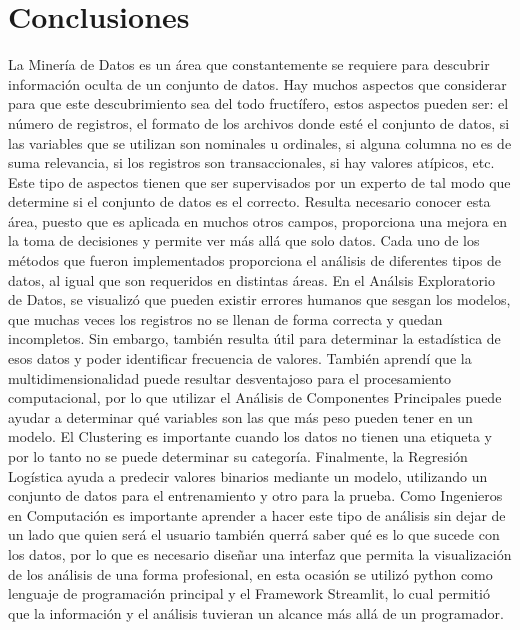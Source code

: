 \documentclass{article}
\begin{document}
\section{Conclusiones}
La Minería de Datos es un área que constantemente se requiere para descubrir información oculta de un conjunto de datos. Hay muchos aspectos que considerar para que este descubrimiento
sea del todo fructífero, estos aspectos pueden ser: el número de registros, el formato de los archivos donde esté el conjunto de datos, si las variables que se utilizan son 
nominales u ordinales, si alguna columna no es de suma relevancia, si los registros son transaccionales, si hay valores atípicos, etc. Este tipo de aspectos tienen que ser supervisados 
por un experto de tal modo que determine si el conjunto de datos es el correcto.
\newline
\newline
\noindent
Resulta necesario conocer esta área, puesto que es aplicada en muchos otros campos, proporciona una mejora en la toma de decisiones y permite ver más allá que solo datos.
Cada uno de los métodos que fueron implementados proporciona el análisis de diferentes tipos de datos, al igual que son requeridos en distintas áreas. En el
Análsis Exploratorio de Datos, se visualizó que pueden existir errores humanos que sesgan los modelos, que muchas veces los registros no se llenan de forma correcta y quedan incompletos.
Sin embargo, también resulta útil para determinar la estadística de esos datos y poder identificar frecuencia de valores. También aprendí que la multidimensionalidad puede resultar
desventajoso para el procesamiento computacional, por lo que utilizar el Análisis de Componentes Principales puede ayudar a determinar qué variables son las que más peso pueden tener
en un modelo. El Clustering es importante cuando los datos no tienen una etiqueta y por lo tanto no se puede determinar su categoría. Finalmente, la Regresión Logística ayuda a predecir
valores binarios mediante un modelo, utilizando un conjunto de datos para el entrenamiento y otro para la prueba.
\newline
\newline
\noindent
Como Ingenieros en Computación es importante aprender a hacer este tipo de análisis sin dejar de un lado que quien será el usuario también querrá saber qué es lo que sucede con los datos,
por lo que es necesario diseñar una interfaz que permita la visualización de los análisis de una forma profesional, en esta ocasión se utilizó python como lenguaje de programación principal y
el Framework Streamlit, lo cual permitió que la información y el análisis tuvieran un alcance más allá de un programador.
\newline
\end{document}
